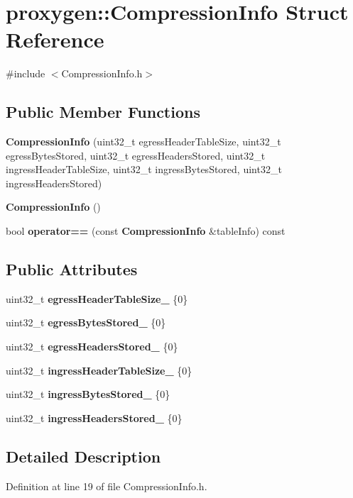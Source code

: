 \section{proxygen\+:\+:Compression\+Info Struct Reference}
\label{structproxygen_1_1CompressionInfo}


{\ttfamily \#include $<$Compression\+Info.\+h$>$}

\subsection*{Public Member Functions}
\begin{DoxyCompactItemize}
\item 
{\bf Compression\+Info} (uint32\+\_\+t egress\+Header\+Table\+Size, uint32\+\_\+t egress\+Bytes\+Stored, uint32\+\_\+t egress\+Headers\+Stored, uint32\+\_\+t ingress\+Header\+Table\+Size, uint32\+\_\+t ingress\+Bytes\+Stored, uint32\+\_\+t ingress\+Headers\+Stored)
\item 
{\bf Compression\+Info} ()
\item 
bool {\bf operator==} (const {\bf Compression\+Info} \&table\+Info) const 
\end{DoxyCompactItemize}
\subsection*{Public Attributes}
\begin{DoxyCompactItemize}
\item 
uint32\+\_\+t {\bf egress\+Header\+Table\+Size\+\_\+} \{0\}
\item 
uint32\+\_\+t {\bf egress\+Bytes\+Stored\+\_\+} \{0\}
\item 
uint32\+\_\+t {\bf egress\+Headers\+Stored\+\_\+} \{0\}
\item 
uint32\+\_\+t {\bf ingress\+Header\+Table\+Size\+\_\+} \{0\}
\item 
uint32\+\_\+t {\bf ingress\+Bytes\+Stored\+\_\+} \{0\}
\item 
uint32\+\_\+t {\bf ingress\+Headers\+Stored\+\_\+} \{0\}
\end{DoxyCompactItemize}


\subsection{Detailed Description}


Definition at line 19 of file Compression\+Info.\+h.



